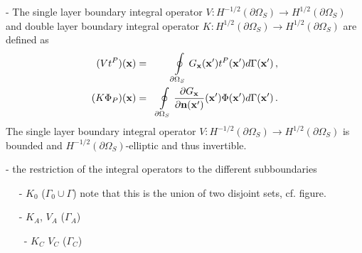 \documentclass[runningheads]{lncse}
\begin{document}
- The single layer boundary integral operator $V : H^{-1/2}(\partial \Omega_S) \to H^{1/2}(\partial \Omega_S) $ and double layer boundary integral operator  $K : H^{1/2}(\partial \Omega_S) \to H^{1/2}(\partial \Omega_S) $ are defined as 
% 
\begin{eqnarray}
(V t^P)({\bf x}) & = & \oint\limits_{\partial \Omega_S}
 G_{\bf x}({\bf x}')  %
     t^P({\bf x}')
 d\Gamma ({\bf x}')  \,, \\
%
(K \Phi_P)({\bf x}) & = & %
\oint\limits_{\partial \Omega_S}
\frac{\partial G_{\bf x} }{\partial{\bf n}({\bf x}') }({\bf x}') 
     \Phi({\bf x}')
 d\Gamma ({\bf x}')  \,.
\end{eqnarray}
%
The single layer boundary integral operator $V : H^{-1/2}(\partial \Omega_S) \to H^{1/2}(\partial \Omega_S) $ is bounded and $H^{-1/2}(\partial \Omega_S)$-elliptic and thus invertible.

- the restriction of the integral operators to the different subboundaries 

~~ - $K_0$ ($\Gamma_0 \cup \Gamma$) note that this is the union of two disjoint sets, cf. figure.

~~ - $K_A$, $V_A $ ($\Gamma_A$)

~ ~ - $K_C$ $V_C$ ($\Gamma_C$)
\end{document}

